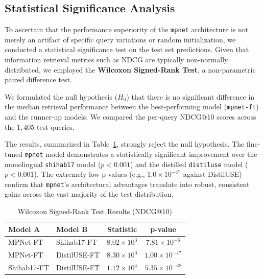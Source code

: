\documentclass[acmsmall,screen,review]{acmart}
\begin{document}
\subsection{Statistical Significance Analysis}

To ascertain that the performance superiority of the \texttt{mpnet} architecture is not merely an artifact of specific query variations or random initialization, we conducted a statistical significance test on the test set predictions. Given that information retrieval metrics such as NDCG are typically non-normally distributed, we employed the \textbf{Wilcoxon Signed-Rank Test}, a non-parametric paired difference test.

We formulated the null hypothesis ($H_0$) that there is no significant difference in the median retrieval performance between the best-performing model (\texttt{mpnet-ft}) and the runner-up models. We compared the per-query NDCG@10 scores across the $1,405$ test queries.

The results, summarized in Table~\ref{tab:significance}, strongly reject the null hypothesis. The fine-tuned \texttt{mpnet} model demonstrates a statistically significant improvement over the monolingual \texttt{shihab17} model ($p < 0.001$) and the distilled \texttt{distiluse} model ($p < 0.001$). The extremely low p-values (e.g., $1.0 \times 10^{-47}$ against DistilUSE) confirm that \texttt{mpnet}'s architectural advantages translate into robust, consistent gains across the vast majority of the test distribution.

\begin{table}[h]
    \centering
    \caption{Wilcoxon Signed-Rank Test Results (NDCG@10)}
    \label{tab:significance}
    \begin{tabular}{llcc}
        \toprule
        \textbf{Model A} & \textbf{Model B} & \textbf{Statistic} & \textbf{p-value} \\
        \midrule
        MPNet-FT & Shihab17-FT & $8.02 \times 10^3$ & $7.81 \times 10^{-6}$ \\
        MPNet-FT & DistilUSE-FT & $8.30 \times 10^3$ & $1.00 \times 10^{-47}$ \\
        Shihab17-FT & DistilUSE-FT & $1.12 \times 10^4$ & $5.35 \times 10^{-38}$ \\
        \bottomrule
    \end{tabular}
\end{table}
\end{document}
